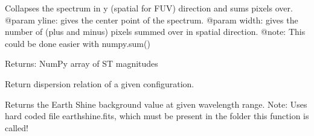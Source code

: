 \documentclass[letterpaper,10pt,english]{sphinxmanual}
\begin{document}

\begin{fulllineitems}
\label{SamPy.plot.COSIHB:SamPy.plot.COSIHB.wrapperSynphot.collapseSpectrumY}
Collapses the spectrum in y (spatial for FUV) direction and 
sums pixels over.
@param yline: gives the center point of the spectrum.
@param width: gives the number of (plus and minus) pixels summed 
over in spatial direction.
@note: This could be done easier with numpy.sum()

\end{fulllineitems}



\begin{fulllineitems}
\label{SamPy.plot.COSIHB:SamPy.plot.COSIHB.wrapperSynphot.fluxToSTMag}
Returns:
NumPy array of ST magnitudes

\end{fulllineitems}



\begin{fulllineitems}
\label{SamPy.plot.COSIHB:SamPy.plot.COSIHB.wrapperSynphot.getDispersion}
Return dispersion relation of a given configuration.

\end{fulllineitems}



\begin{fulllineitems}
\label{SamPy.plot.COSIHB:SamPy.plot.COSIHB.wrapperSynphot.getEarthShineBackground}
Returns the Earth Shine background value at given wavelength range.
Note: Uses hard coded file earthshine.fits, which must be present in the folder
this function is called!

\end{fulllineitems}
\end{document}
